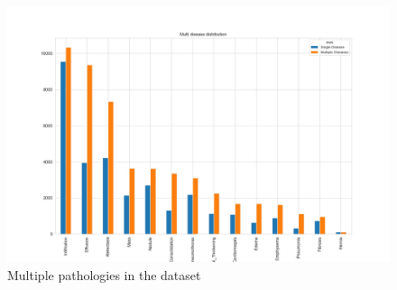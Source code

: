 \documentclass{article}
\begin{document}
    \begin{figure}
        \includegraphics[width=\linewidth]{./images/multiple_disease_distribution.jpg}
        \caption{Multiple pathologies in the dataset}
        \label{fig:multiple-diseases}
    \end{figure}
\end{document}
